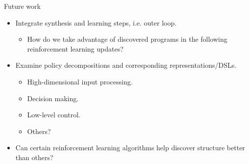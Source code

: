 \begin{frame}{Future work}
\begin{itemize}
    \item Integrate synthesis and learning steps, i.e. outer loop.
    \begin{itemize}
        \item How do we take advantage of discovered programs in the following reinforcement learning updates?
    \end{itemize}
    \item Examine policy decompositions and corresponding representations/DSLs.
    \begin{itemize}
        \item High-dimensional input processing.
        \item Decision making.
        \item Low-level control.
        \item Others?
    \end{itemize}
    \item Can certain reinforcement learning algorithms help discover structure better than others?
\end{itemize}
\end{frame}